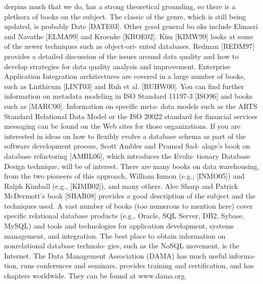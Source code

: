 derpins much that we do, has a strong theoretical grounding, so there is a
plethora of books on the subject. The classic of the genre, which is still being
updated, is probably Date [DATE03]. Other good general bo oks include
Elmasri and Navathe [ELMA99] and Kroenke [KROE02].
Kim [KIMW99] looks at some of the newer techniques such as object-ori-
ented databases. Redman [REDM97] provides a detailed discussion of the issues
around data quality and how to develop strategies for data quality analysis and
improvement.
Enterprise Application Integration architectures are covered in a large
number of books, such as Linthicum [LINT03] and Ruh et al. [RUHW00].
You can find further information on metadata modeling in ISO Standard
11197-3 [ISO96] and books such as [MARC00]. Information on specific meta-
data models such as the ARTS Standard Relational Data Model or the ISO
20022 standard for financial services messaging can be found on the Web sites
for those organizations.
If you are interested in ideas on how to flexibly evolve a database schema
as part of the software development process, Scott Ambler and Pramod Sad-
alage’s book on database refactoring [AMBL06], which introduces the Evolu-
tionary Database Design technique, will be of interest.
There are many books on data warehousing, from the two pioneers of this
approach, William Inmon (e.g., [INMO05]) and Ralph Kimball (e.g.,
[KIMB02]), and many others.
Alec Sharp and Patrick McDermott’s book [SHAR08] provides a good
description of the subject and the techniques used. A vast number of books
(too numerous to mention here) cover specific relational database products
(e.g., Oracle, SQL Server, DB2, Sybase, MySQL) and tools and technologies for
application development, systems management, and integration.
The best place to obtain information on nonrelational database technolo-
gies, such as the NoSQL movement, is the Internet.
The Data Management Association (DAMA) has much useful informa-
tion, runs conferences and seminars, provides training and certification, and
has chapters worldwide. They can be found at www.dama.org.
